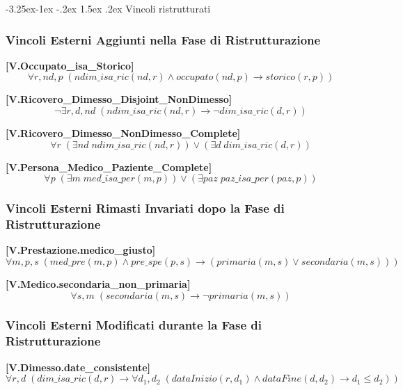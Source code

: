 \documentclass{article}
\makeatletter
\renewcommand\subsection{\@startsection{subsection}{2}{\z@}%
                                     {-3.25ex\@plus-1ex \@minus-.2ex}%
                                     {1.5ex \@plus.2ex}%
                                     {\normalfont\normalsize\bfseries}}
\makeatother
\begin{document}
\newpage

\subsection{Vincoli ristrutturati}

\subsubsection{Vincoli Esterni Aggiunti nella Fase di Ristrutturazione}

\textbf{[V.Occupato\_isa\_Storico]}\\
\[
\forall r,nd,p \; (ndim\_isa\_ric(nd,r) \land occupato(nd,p) \rightarrow storico(r,p))
\]

\textbf{[V.Ricovero\_Dimesso\_Disjoint\_NonDimesso]}\\
\[
\neg \exists r,d,nd \; (ndim\_isa\_ric(nd,r) \rightarrow \neg dim\_isa\_ric(d,r))
\]

\textbf{[V.Ricovero\_Dimesso\_NonDimesso\_Complete]}\\
\[
\forall r \; (\exists nd \; ndim\_isa\_ric(nd,r)) \lor (\exists d \; dim\_isa\_ric(d,r))
\]

\textbf{[V.Persona\_Medico\_Paziente\_Complete]}\\
\[
\forall p \; (\exists m \; med\_isa\_per(m,p)) \lor (\exists paz \; paz\_isa\_per(paz,p))
\]

\subsubsection{Vincoli Esterni Rimasti Invariati dopo la Fase di Ristrutturazione}

\textbf{[V.Prestazione.medico\_giusto]}\\
\[
\forall m,p,s \; (med\_pre(m,p) \land pre\_spe(p,s) \rightarrow (primaria(m,s) \lor secondaria(m,s)))
\]

\textbf{[V.Medico.secondaria\_non\_primaria]}\\
\[
\forall s,m \; (secondaria(m,s) \rightarrow \neg primaria(m,s))
\]

\subsubsection{Vincoli Esterni Modificati durante la Fase di Ristrutturazione}

\textbf{[V.Dimesso.date\_consistente]}\\
\[
\forall r,d \; (dim\_isa\_ric(d,r) \rightarrow \forall d_1,d_2 \; (dataInizio(r,d_1) \land dataFine(d,d_2) \rightarrow d_1 \leq d_2))
\]
\end{document}
